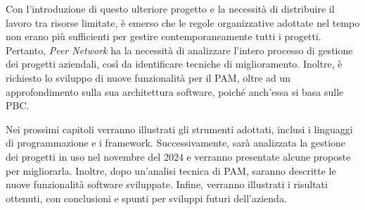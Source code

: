 Con l’introduzione di questo ulteriore progetto e la necessità di distribuire il lavoro tra risorse limitate, 
è emerso che le regole organizzative adottate nel tempo non erano più sufficienti per gestire contemporaneamente 
tutti i progetti. Pertanto, \textit{Peer Network} ha la necessità di analizzare l’intero processo di gestione 
dei progetti aziendali, così da identificare tecniche di miglioramento. Inoltre, è richiesto lo sviluppo di 
nuove funzionalità per il \ac{PAM}, oltre ad un approfondimento sulla sua architettura software, poiché 
anch'essa si basa sulle \ac{PBC}.

Nei prossimi capitoli verranno illustrati gli strumenti adottati, inclusi i linguaggi di programmazione e 
i framework. Successivamente, sarà analizzata la gestione dei progetti in uso nel novembre del 2024 e 
verranno presentate alcune proposte per migliorarla. Inoltre, dopo un’analisi tecnica di \ac{PAM}, saranno 
descritte le nuove funzionalità software sviluppate. Infine, verranno illustrati i risultati ottenuti, 
con conclusioni e spunti per sviluppi futuri dell'azienda.
